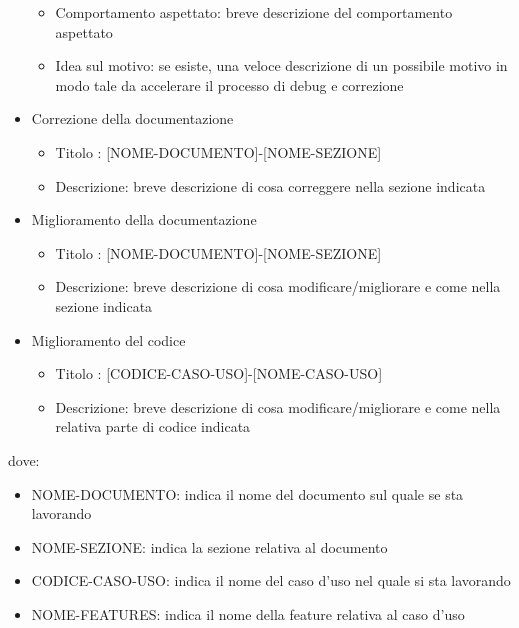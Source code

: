 \begin{itemize}
\begin{itemize}
                \item Comportamento aspettato: breve descrizione del comportamento aspettato 
                \item Idea sul motivo: se esiste, una veloce descrizione di un possibile motivo in modo tale da accelerare il processo di debug e correzione
            \end{itemize}
            \item  Correzione della documentazione
            \begin{itemize}
                \item Titolo : [NOME-DOCUMENTO]-[NOME-SEZIONE]
                \item Descrizione: breve descrizione di cosa correggere nella sezione indicata
            \end{itemize}
            \item  Miglioramento della documentazione
            \begin{itemize}
                \item Titolo : [NOME-DOCUMENTO]-[NOME-SEZIONE]
                \item Descrizione: breve descrizione di cosa modificare/migliorare e come nella sezione indicata
            \end{itemize}
            \item  Miglioramento del codice
            \begin{itemize}
                 \item Titolo : [CODICE-CASO-USO]-[NOME-CASO-USO]
                 \item Descrizione: breve descrizione di cosa modificare/migliorare e come nella relativa parte di codice indicata
            \end{itemize}
        \end{itemize}
        dove:

        \begin{itemize}
            \item NOME-DOCUMENTO: indica il nome del documento sul quale se sta lavorando
            \item NOME-SEZIONE: indica la sezione relativa al documento
            \item CODICE-CASO-USO: indica il nome del caso d'uso nel quale si sta lavorando
            \item NOME-FEATURES: indica il nome della feature relativa al caso d'uso
        \end{itemize}



